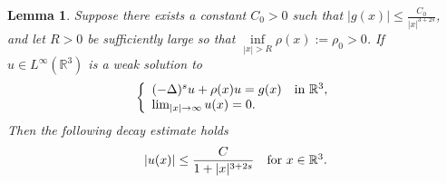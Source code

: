 \documentclass[reqno, 11pt]{amsart} %
\numberwithin{equation}{section}
\newtheorem{lemma}[theorem]{Lemma}
\begin{document}
	\begin{lemma}\label{lem5-2}
		Suppose there exists a constant $C_{0}>0$ such that $|g(x)|\leq\frac{C_{0}}{|x|^{3+2s}}$, and let $R>0$ be sufficiently large so that  $\inf\limits_{|x|>R}\rho(x):=\rho_{0}>0$. If $u\in L^{\infty}(\mathbb{R}^{3})$ is a weak solution to
		\begin{equation}\label{equ5-10}
			\left\{
			\begin{array}{ll}
				(-\Delta)^{s}u+\rho(x)u=g(x) \quad \hbox{in $\mathbb{R}^{3}$},\\
				\lim_{|x|\rightarrow\infty}u(x)=0.
			\end{array}
			\right.
		\end{equation}
		Then the following decay estimate holds
		\begin{equation}\label{equ5-11}
			|u(x)|\leq\frac{C}{1+|x|^{3+2s}}\quad \hbox{for $x\in \mathbb{R}^{3}$}.
		\end{equation}
	\end{lemma}
\end{document}
